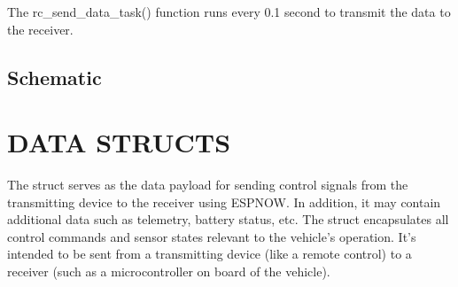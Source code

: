 \documentclass[letterpaper,10pt,english]{sphinxmanual}
\begin{document}
\sphinxAtStartPar
The rc\_send\_data\_task() function runs every 0.1 second to transmit the data to the receiver.

\begin{sphinxVerbatim}[commandchars=\\\{\}]

\end{sphinxVerbatim}


\section{Schematic}
\label{\detokenize{overview:schematic}}
\noindent{}

\sphinxstepscope


\chapter{DATA STRUCTS}
\label{\detokenize{data:data-structs}}\label{\detokenize{data::doc}}
\sphinxAtStartPar
The struct serves as the data payload for sending control signals from the transmitting device to the receiver using ESP\sphinxhyphen{}NOW.
In addition, it may contain additional data such as telemetry, battery status, etc. The  struct encapsulates all control commands and sensor states
relevant to the vehicle’s operation. It’s intended to be sent from a transmitting device (like a remote control) to a receiver
(such as a microcontroller on board of the vehicle).
\end{document}
